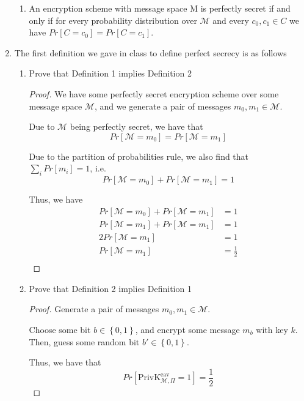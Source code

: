 \documentclass{article}
\begin{document}
\begin{enumerate}
\begin{enumerate}
      \item An encryption scheme with message space M is perfectly secret if and 
        only if for every probability distribution over $\mathcal{M}$ and every
        $c_0, c_1 \in C$ 
        we have $Pr\left[C = c_0\right] = Pr\left[C = c_1\right]$.
    \end{enumerate}
  \item The first definition we gave in class to define perfect secrecy is as follows
    \begin{enumerate}
      \item Prove that Definition 1 implies Definition 2

        \begin{proof}
          We have some perfectly secret encryption scheme over some message 
          space $\mathcal{M}$, and we generate a pair of messages 
          $m_0, m_1 \in \mathcal{M}$.

          Due to $\mathcal{M}$ being perfectly secret, we have that
          \[
            Pr[\mathcal{M} = m_0] = Pr[\mathcal{M} = m_1]
          \]

          Due to the partition of probabilities rule, we also find that
          $\sum\limits_{i} Pr[m_i] = 1$, i.e.
          \[
            Pr[\mathcal{M} = m_0] + Pr[\mathcal{M} = m_1] = 1
          \]

          Thus, we have
          \begin{align*}
            Pr[\mathcal{M} = m_0] + Pr[\mathcal{M} = m_1] &= 1\\
            Pr[\mathcal{M} = m_1] + Pr[\mathcal{M} = m_1] &= 1\\
            2Pr[\mathcal{M} = m_1] &= 1\\
            Pr[\mathcal{M} = m_1] &= \frac{1}{2}\\
          \end{align*}
        \end{proof}

      \item Prove that Definition 2 implies Definition 1
        
        \begin{proof}
          Generate a pair of messages $m_0, m_1 \in \mathcal{M}$.

          Choose some bit $b \in \left\{0, 1\right\}$, and encrypt some message
          $m_b$ with key $k$. Then, guess some random bit 
          $b' \in \left\{0, 1\right\}$.

          Thus, we have that
          \[
            Pr[\text{PrivK}_{\mathcal{M}, \Pi}^{\text{eav}} = 1] = \frac{1}{2}
          \]


\end{proof}
\end{enumerate}
\end{enumerate}
\end{document}

